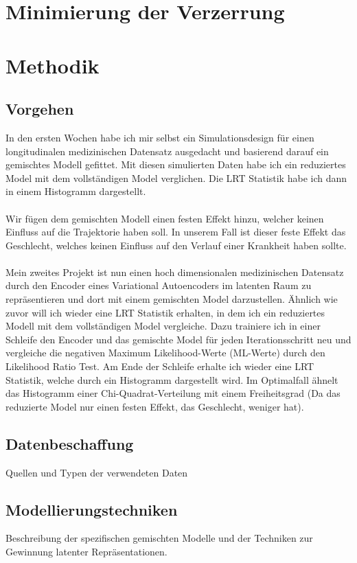 \documentclass[%
thesis=student,%
coverpage=false,%
titlepage=false,%
headmarks=true, %
german,%
font=libertine, %
math=newpxtx, %
BCOR=5mm,%
coverBCOR=11mm%
]{tumbook}
\theoremstyle{break}
\begin{document}
\chapter{Minimierung der Verzerrung}

\chapter{Methodik}
\section{Vorgehen}
In den ersten Wochen habe ich mir selbst ein Simulationsdesign für einen longitudinalen medizinischen Datensatz ausgedacht und basierend darauf ein gemischtes Modell gefittet. Mit diesen simulierten Daten habe ich ein reduziertes Model mit dem vollständigen Model verglichen. Die LRT Statistik habe ich dann in einem Histogramm dargestellt.\\
\\
Wir fügen dem gemischten Modell einen festen Effekt hinzu, welcher keinen Einfluss auf die Trajektorie haben soll. In unserem Fall ist dieser feste Effekt das Geschlecht, welches keinen Einfluss auf den Verlauf einer Krankheit haben sollte.\\
\\
Mein zweites Projekt ist nun einen hoch dimensionalen medizinischen Datensatz durch den Encoder eines Variational Autoencoders im latenten Raum zu repräsentieren und dort mit einem gemischten Model darzustellen. Ähnlich wie zuvor will ich wieder eine LRT Statistik erhalten, in dem ich ein reduziertes Modell mit dem vollständigen Model vergleiche. Dazu trainiere ich in einer Schleife den Encoder und das gemischte Model für jeden Iterationsschritt neu und vergleiche die negativen Maximum Likelihood-Werte (ML-Werte) durch den Likelihood Ratio Test. Am Ende der Schleife erhalte ich wieder eine LRT Statistik, welche durch ein Histogramm dargestellt wird. Im Optimalfall ähnelt das Histogramm einer Chi-Quadrat-Verteilung mit einem Freiheitsgrad (Da das reduzierte Model nur einen festen Effekt, das Geschlecht, weniger hat).\\
\section{Datenbeschaffung}
Quellen und Typen der verwendeten Daten
\section{Modellierungstechniken}
Beschreibung der spezifischen gemischten Modelle und der Techniken zur Gewinnung latenter Repräsentationen.
\end{document}

